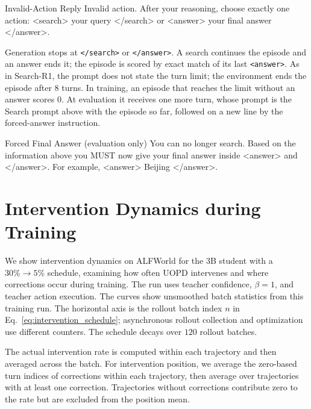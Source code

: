 \begin{promptbox}{Invalid-Action Reply}
Invalid action. After your reasoning, choose exactly one action: <search> your query </search> or <answer> your final answer </answer>.
\end{promptbox}

\noindent Generation stops at \texttt{</search>} or \texttt{</answer>}. A search continues the episode
and an answer ends it; the episode is scored by exact match of its last \texttt{<answer>}. As in
Search-R1, the prompt does not state the turn limit; the environment ends the episode after $8$ turns.
In training, an episode that reaches the limit without an answer scores $0$. At evaluation it receives
one more turn, whose prompt is the Search prompt above with the episode so far, followed on a new line
by the forced-answer instruction.

\begin{promptbox}{Forced Final Answer (evaluation only)}
You can no longer search. Based on the information above you MUST now give your final answer inside <answer> and </answer>. For example, <answer> Beijing </answer>.
\end{promptbox}

\FloatBarrier



\section{Intervention Dynamics during Training}
\label{app:telemetry}
\label{sec:analysis}

We show intervention dynamics on ALFWorld for the 3B student with a
$30\%\!\to\!5\%$ schedule, examining how often UOPD intervenes and
where corrections occur during training. The run uses teacher confidence,
$\beta=1$, and teacher action execution. The curves show unsmoothed batch
statistics from this training run. The horizontal axis is the rollout
batch index $n$ in Eq.~\ref{eq:intervention_schedule}; asynchronous rollout
collection and optimization use different counters. The schedule decays over
$120$ rollout batches.

The actual intervention rate is computed within each trajectory and then averaged
across the batch. For intervention position, we average the zero-based turn indices
of corrections within each trajectory, then average over trajectories with at
least one correction. Trajectories without corrections contribute zero to the
rate but are excluded from the position mean.

